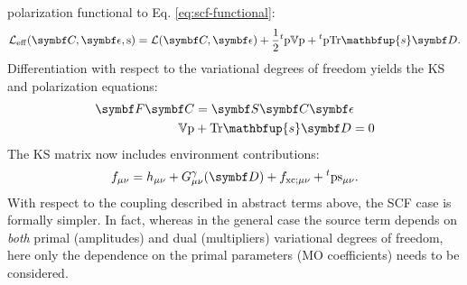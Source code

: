 polarization functional to Eq. \eqref{eq:scf-functional}:
\begin{equation}\label{eq:polarizable-scf-functional}
  \mathcal{L}_\mathrm{eff}(\mat{C}, \mat{\epsilon}, \s) =
  \mathcal{L}(\mat{C}, \mat{\epsilon}) +
  \frac{1}{2}{}^t\p\V\p + {}^t\p\Tr\mathbfup{s}\mat{D}.
\end{equation}
Differentiation with respect to the variational degrees of freedom
yields the \acrshort*{KS} and polarization equations:
\begin{subequations}
  \begin{align}
    \mat{F}\mat{C} &= \mat{S}\mat{C}\mat{\epsilon} \\
    \V\p &+ \Tr\mathbfup{s}\mat{D} = 0 \label{eq:polarization-stat}
  \end{align}
\end{subequations}
The \acrshort*{KS} matrix now includes environment contributions:
\begin{equation}
  f_{\mu\nu} = h_{\mu\nu}  + G^\gamma_{\mu\nu}(\mat{D}) + f_{\mathrm{xc};\mu\nu}
  + {}^t\p\s_{\mu\nu}.
\end{equation}
With respect to the coupling described in abstract terms above, the
\acrshort*{SCF} case is formally simpler. In fact, whereas in the
general case the source term depends on \emph{both} primal (amplitudes)
and dual (multipliers) variational degrees of freedom, here only the
dependence on the primal parameters (\acrshort*{MO} coefficients) needs
to be considered.\autocite{Lipparini2011-aj}
